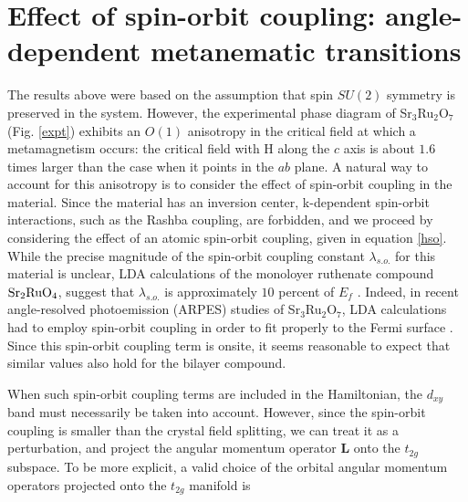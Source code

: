 \documentclass[prb,aps,amssymb,showpacs,twocolumn,amsmath,floatfix]{revtex4}
\def\SRO{Sr$_3$Ru$_2$O$_7$}
\begin{document}
\section{Effect of spin-orbit coupling: angle-dependent metanematic transitions}
\label{soc}
The results above were based on the assumption that spin $SU(2)$ symmetry is preserved in the system.  
However, the experimental phase diagram \cite{Grigera2003} of \SRO (Fig. \ref{expt}) exhibits an $O(1)$ anisotropy 
in the critical field at which a metamagnetism occurs: the critical field with H along the $c$ axis is about $1.6$ times 
larger than the case when it points in the $ab$ plane.  A natural way to account for this anisotropy is 
to consider the effect of spin-orbit coupling in the material.  Since the material has an inversion center, 
k-dependent spin-orbit interactions, such as the Rashba coupling, are forbidden, and we proceed by 
considering the effect of an atomic  spin-orbit coupling, given in equation \ref{hso}.  
While the precise magnitude of the spin-orbit coupling constant 
$\lambda_{s.o.}$ for this material is unclear, LDA calculations of the monoloyer ruthenate 
compound 
${\rm Sr}_2{\rm RuO}_4$, suggest that  $\lambda_{s.o.}  $ is approximately $10$ percent of $E_f$
\cite{Haverkort2008, Liu2008}.  Indeed, in recent angle-resolved photoemission (ARPES) studies of \SRO, 
LDA calculations had to employ spin-orbit coupling in order to fit properly to the Fermi surface \cite{Tamai2008}.  Since this spin-orbit coupling term is onsite, 
it seems reasonable to expect that similar values 
also hold for the bilayer compound.   

When such spin-orbit coupling terms are included in the Hamiltonian, 
the $d_{xy}$ 
band 
must necessarily be taken 
into account.  However, since the spin-orbit coupling is smaller than the crystal field splitting, we can 
treat it as a perturbation, and project the angular momentum operator $\bm L$ 
onto the $t_{2g}$ subspace.  
To be more explicit, a valid choice of the orbital 
angular momentum operators projected onto the $t_{2g}$ manifold is
\end{document}
